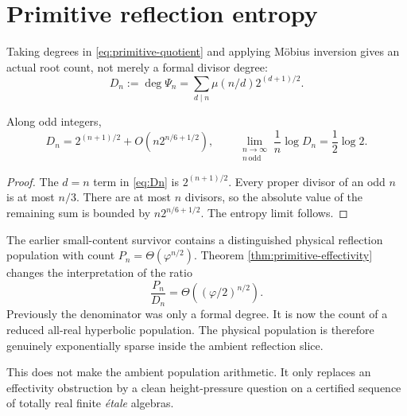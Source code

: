 \section{Primitive reflection entropy}\label{sec:entropy}

Taking degrees in \eqref{eq:primitive-quotient} and applying M\"obius
inversion gives an actual root count, not merely a formal divisor degree:
\begin{equation}\label{eq:Dn}
D_n:=\deg\Psi_n
=\sum_{d\mid n}\mu(n/d)2^{(d+1)/2}.
\end{equation}

\begin{proposition}\label{prop:entropy}
Along odd integers,
\[
D_n=2^{(n+1)/2}+O\!\left(n2^{n/6+1/2}\right),
\qquad
\lim_{\substack{n\to\infty\\ n\,\mathrm{odd}}}
\frac1n\log D_n=\frac12\log2.
\]
\end{proposition}

\begin{proof}
The $d=n$ term in \eqref{eq:Dn} is $2^{(n+1)/2}$.  Every proper divisor of
an odd $n$ is at most $n/3$.  There are at most $n$ divisors, so the absolute
value of the remaining sum is bounded by $n2^{n/6+1/2}$.  The entropy limit
follows.
\end{proof}

The earlier small-content survivor contains a distinguished physical
reflection population with count $P_n=\Theta(\varphi^{n/2})$.  Theorem
\ref{thm:primitive-effectivity} changes the interpretation of the ratio
\begin{equation}\label{eq:density-gap}
\frac{P_n}{D_n}=\Theta\!\left((\varphi/2)^{n/2}\right).
\end{equation}
Previously the denominator was only a formal degree.  It is now the count of
a reduced all-real hyperbolic population.  The physical population is
therefore genuinely exponentially sparse inside the ambient reflection
slice.

This does not make the ambient population arithmetic.  It only replaces an
effectivity obstruction by a clean height-pressure question on a certified
sequence of totally real finite \emph{\'etale} algebras.
